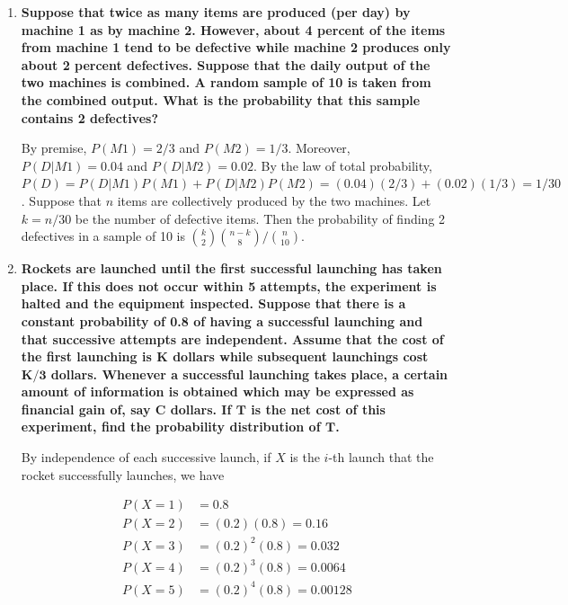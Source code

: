 \documentclass[10pt, oneside]{article}
\begin{document}
\begin{enumerate}[label=4.\arabic*]
\item  \begin{tcolorbox}[
  colback=Cerulean!5!white,
  colframe=Cerulean!75!black]
\textbf{Suppose that twice as many items are produced (per day) by machine 1 as by machine 2. However, about 4 percent of the items from machine 1 tend to be defective while machine 2 produces only about 2 percent defectives. Suppose that the daily output of the two machines is combined. A random sample of 10 is taken from the combined output. What is the probability that this sample contains 2 defectives?}
\end{tcolorbox}

By premise, $P(M1) = 2/3$ and $P(M2) = 1/3$. Moreover, $P(D | M1) = 0.04$ and $P(D | M2) = 0.02$. By the law of total probability, $P(D) = P(D | M1) P(M1) + P(D | M2) P(M2) = (0.04)(2/3) + (0.02)(1/3) = 1/30$. Suppose that $n$ items are collectively produced by the two machines. Let $k = n/30$ be the number of defective items. Then the probability of finding 2 defectives in a sample of 10 is $\boxed{ \binom{k}{2} \binom{n-k}{8} / \binom{n}{10} }$.

\item  \begin{tcolorbox}[
  colback=Cerulean!5!white,
  colframe=Cerulean!75!black]
\textbf{Rockets are launched until the first successful launching has taken place. If this does not occur within 5 attempts, the experiment is halted and the equipment inspected. Suppose that there is a constant probability of 0.8 of having a successful launching and that successive attempts are independent. Assume that the cost of the first launching is $\bm{K}$ dollars while subsequent launchings cost $\bm{K/3}$ dollars. Whenever a successful launching takes place, a certain amount of information is obtained which may be expressed as financial gain of, say $\bm{C}$ dollars. If $\bm{T}$ is the net cost of this experiment, find the probability distribution of $\bm{T}$.}
\end{tcolorbox}

By independence of each successive launch, if $X$ is the $i$-th launch that the rocket successfully launches, we have

\begin{align*}
P(X = 1) &= 0.8 \\
P(X = 2) &= (0.2)(0.8) = 0.16 \\
P(X = 3) &= (0.2)^2 (0.8) = 0.032 \\
P(X = 4) &= (0.2)^3 (0.8) = 0.0064 \\
P(X = 5) &= (0.2)^4 (0.8) = 0.00128
\end{align*}


\end{enumerate}
\end{document}
